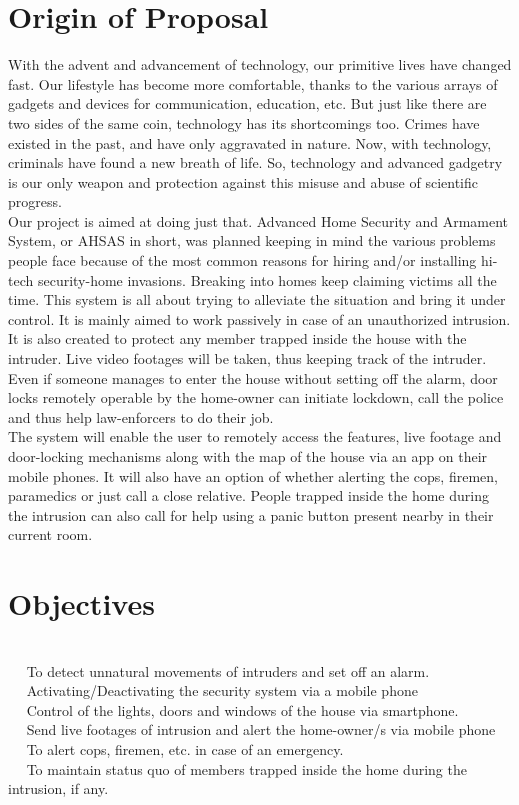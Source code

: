 \documentclass[margin, centered]{res}
\begin{document}
\begin{resume}
\section{Origin of Proposal}
With the advent and advancement of technology, our primitive lives have changed fast. Our lifestyle has become more comfortable, thanks to the various arrays of gadgets and devices for communication, education, etc. But just like there are two sides of the same coin, technology has its shortcomings too. Crimes have existed in the past, and have only aggravated in nature. Now, with technology, criminals have found a new breath of life. So, technology and advanced gadgetry is our only weapon and protection against this misuse and abuse of scientific progress.\\
Our project is aimed at doing just that. Advanced Home Security and Armament System, or AHSAS in short, was planned keeping in mind the various problems people face because of the most common reasons for hiring and/or installing hi-tech security-home invasions. Breaking into homes keep claiming victims all the time. This system is all about trying to alleviate the situation and bring it under control. It is mainly aimed to work passively in case of an unauthorized intrusion. It is also created to protect any member trapped inside the house with the intruder. Live video footages will be taken, thus keeping track of the intruder. Even if someone manages to enter the house without setting off the alarm, door locks remotely operable by the home-owner can initiate lockdown, call the police and thus help law-enforcers to do their job.\\
The system will enable the user to remotely access the features, live footage and door-locking mechanisms along with the map of the house via an app on their mobile phones. It will also have an option of whether alerting the cops, firemen, paramedics or just call a close relative. People trapped inside the home during the intrusion can also call for help using a panic button present nearby in their current room.
\section{Objectives}
\hspace{5mm} \\
~\textbullet~ To detect unnatural movements of intruders and set off an alarm.\\
~\textbullet~ Activating/Deactivating the security system via a mobile phone\\
~\textbullet~ Control of the lights, doors and windows of the house via smartphone.\\
~\textbullet~ Send live footages of intrusion and alert the home-owner/s via mobile phone\\
~\textbullet~ To alert cops, firemen, etc. in case of an emergency.\\
~\textbullet~ To maintain status quo of members trapped inside the home during the intrusion, if any.


\end{resume}
\end{document}
